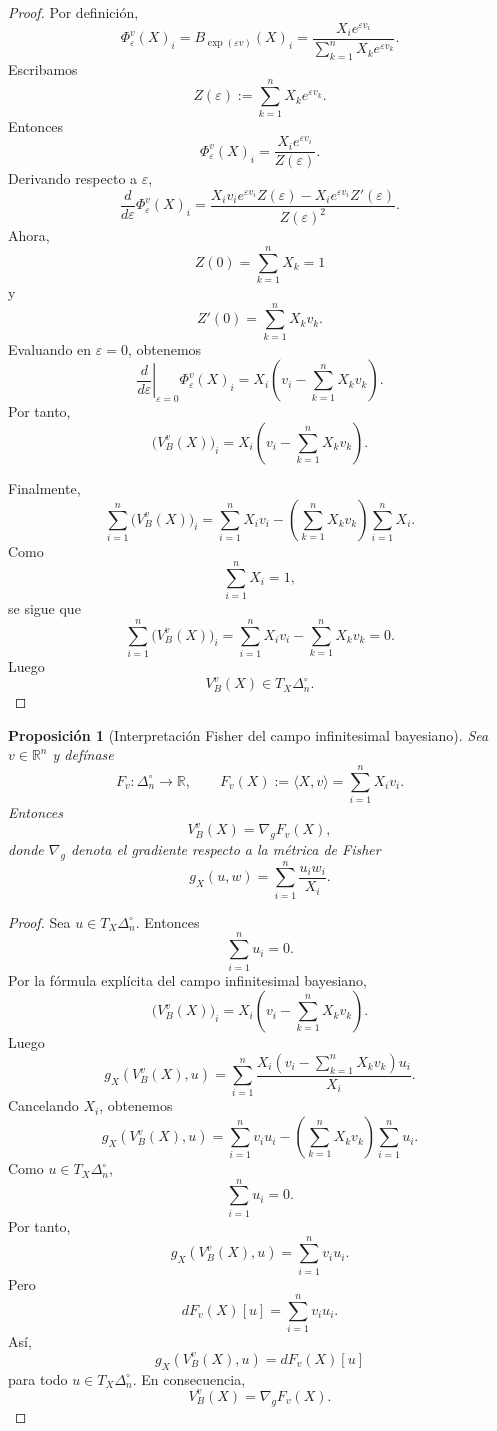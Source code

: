 \documentclass[12pt]{article}
\newtheorem{proposicion}{Proposición}[section]
\begin{document}
\begin{proof}
Por definición,
\[
\Phi_\varepsilon^v(X)_i
=
B_{\exp(\varepsilon v)}(X)_i
=
\frac{
X_i e^{\varepsilon v_i}
}{
\sum_{k=1}^{n}X_k e^{\varepsilon v_k}
}.
\]
Escribamos
\[
Z(\varepsilon)
:=
\sum_{k=1}^{n}X_k e^{\varepsilon v_k}.
\]
Entonces
\[
\Phi_\varepsilon^v(X)_i
=
\frac{X_i e^{\varepsilon v_i}}{Z(\varepsilon)}.
\]
Derivando respecto a \(\varepsilon\),
\[
\frac{d}{d\varepsilon}\Phi_\varepsilon^v(X)_i
=
\frac{
X_i v_i e^{\varepsilon v_i}Z(\varepsilon)
-
X_i e^{\varepsilon v_i}Z'(\varepsilon)
}{
Z(\varepsilon)^2
}.
\]
Ahora,
\[
Z(0)=\sum_{k=1}^{n}X_k=1
\]
y
\[
Z'(0)
=
\sum_{k=1}^{n}X_kv_k.
\]
Evaluando en \(\varepsilon=0\), obtenemos
\[
\left.\frac{d}{d\varepsilon}\right|_{\varepsilon=0}
\Phi_\varepsilon^v(X)_i
=
X_i
\left(
v_i-\sum_{k=1}^{n}X_kv_k
\right).
\]
Por tanto,
\[
\bigl(V_B^v(X)\bigr)_i
=
X_i
\left(
v_i-\sum_{k=1}^{n}X_kv_k
\right).
\]

Finalmente,
\[
\sum_{i=1}^{n}\bigl(V_B^v(X)\bigr)_i
=
\sum_{i=1}^{n}X_iv_i
-
\left(\sum_{k=1}^{n}X_kv_k\right)
\sum_{i=1}^{n}X_i.
\]
Como
\[
\sum_{i=1}^{n}X_i=1,
\]
se sigue que
\[
\sum_{i=1}^{n}\bigl(V_B^v(X)\bigr)_i
=
\sum_{i=1}^{n}X_iv_i
-
\sum_{k=1}^{n}X_kv_k
=
0.
\]
Luego
\[
V_B^v(X)\in T_X\Delta_n^\circ.
\]
\end{proof}

\begin{proposicion}[Interpretación Fisher del campo infinitesimal bayesiano]
Sea \(v\in\mathbb{R}^{n}\) y defínase
\[
F_v:\Delta_n^\circ\longrightarrow\mathbb{R},
\qquad
F_v(X):=\langle X,v\rangle
=
\sum_{i=1}^{n}X_iv_i.
\]
Entonces
\[
V_B^v(X)=\nabla_g F_v(X),
\]
donde \(\nabla_g\) denota el gradiente respecto a la métrica de Fisher
\[
g_X(u,w)
=
\sum_{i=1}^{n}\frac{u_iw_i}{X_i}.
\]
\end{proposicion}

\begin{proof}
Sea \(u\in T_X\Delta_n^\circ\). Entonces
\[
\sum_{i=1}^{n}u_i=0.
\]
Por la fórmula explícita del campo infinitesimal bayesiano,
\[
\bigl(V_B^v(X)\bigr)_i
=
X_i
\left(
v_i-\sum_{k=1}^{n}X_kv_k
\right).
\]
Luego
\[
g_X(V_B^v(X),u)
=
\sum_{i=1}^{n}
\frac{
X_i\left(v_i-\sum_{k=1}^{n}X_kv_k\right)u_i
}{X_i}.
\]
Cancelando \(X_i\), obtenemos
\[
g_X(V_B^v(X),u)
=
\sum_{i=1}^{n}v_iu_i
-
\left(\sum_{k=1}^{n}X_kv_k\right)
\sum_{i=1}^{n}u_i.
\]
Como \(u\in T_X\Delta_n^\circ\),
\[
\sum_{i=1}^{n}u_i=0.
\]
Por tanto,
\[
g_X(V_B^v(X),u)
=
\sum_{i=1}^{n}v_iu_i.
\]
Pero
\[
dF_v(X)[u]
=
\sum_{i=1}^{n}v_iu_i.
\]
Así,
\[
g_X(V_B^v(X),u)=dF_v(X)[u]
\]
para todo \(u\in T_X\Delta_n^\circ\). En consecuencia,
\[
V_B^v(X)=\nabla_g F_v(X).
\]
\end{proof}
\end{document}
